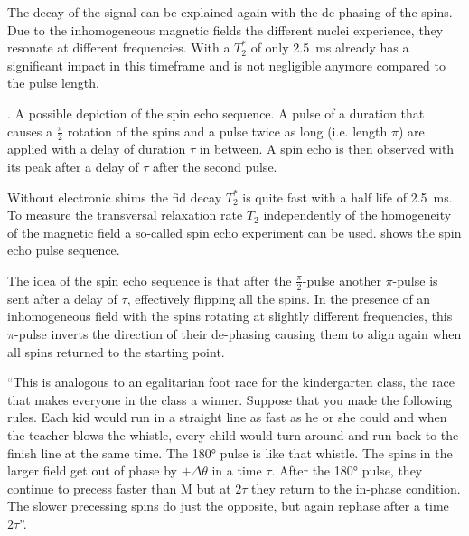 The decay of the signal can be explained again with the de-phasing of the spins. Due to the inhomogeneous magnetic fields the different nuclei experience, they resonate at different frequencies. With a \(T_2^*\) of only \qty{2.5}{\milli\second} already has a significant impact in this timeframe and is not negligible anymore compared to the pulse length.

\begin{marginfigure}
    \centering
    
    \caption{. A possible depiction of the spin echo sequence. A pulse of a duration that causes a \(\frac{\pi}{2}\) rotation of the spins and a pulse twice as long (i.e. length \(\pi\)) are applied with a delay of duration \(\tau\) in between. A spin echo is then observed with its peak after a delay of \(\tau\) after the second pulse.}
\end{marginfigure}

Without electronic shims the \acrshort{fid} decay \(T_2^*\) is quite fast with a half life of \qty{2.5}{\milli\second}. To measure the transversal relaxation rate \(T_2\) independently of the homogeneity of the magnetic field a so-called spin echo experiment can be used.  shows the spin echo pulse sequence.

The idea of the spin echo sequence is that after the \(\frac{\pi}{2}\)-pulse another \(\pi\)-pulse is sent after a delay of \(\tau\), effectively flipping all the spins. In the presence of an inhomogeneous field with the spins rotating at slightly different frequencies, this \(\pi\)-pulse inverts the direction of their de-phasing causing them to align again when all spins returned to the starting point.

\enquote{This is analogous to an egalitarian foot race for the kindergarten class, the race that makes everyone in the class a winner. Suppose that you made the following rules. Each kid would run in a straight line as fast as he or she could and when the teacher blows the whistle, every child would turn around and run back to the finish line at the same time. The \ang{180} pulse is like that whistle. The spins in the larger field get out of phase by \(+\Delta\theta\) in a time \(\tau\). After the \ang{180} pulse, they continue to precess faster than M but at \(2\tau\) they return to the in-phase condition. The slower precessing spins do just the opposite, but again rephase after a time \(2\tau\)}.

